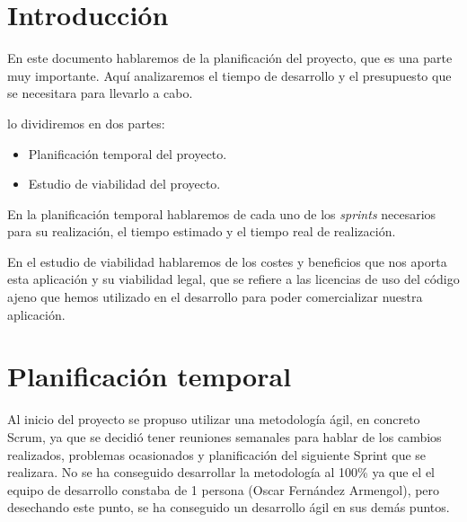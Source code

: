 
\section{Introducción}

En este documento hablaremos de la planificación del proyecto, que es una parte muy importante. Aquí analizaremos el tiempo de desarrollo y el presupuesto que se necesitara para llevarlo a cabo.

lo dividiremos en dos partes:

\begin{itemize}
	\tightlist
	\item
	Planificación temporal del proyecto.
	\item
	Estudio de viabilidad del proyecto.
\end{itemize}

En la planificación temporal hablaremos de cada uno de los \emph{sprints} necesarios para su realización, el tiempo estimado y el tiempo real de realización.

En el estudio de viabilidad hablaremos de los costes y beneficios que nos aporta esta aplicación y su viabilidad legal, que se refiere a las licencias de uso del código ajeno que hemos utilizado en el desarrollo para poder comercializar nuestra aplicación.

\section{Planificación temporal}

Al inicio del proyecto se propuso utilizar una metodología ágil, en concreto Scrum, ya que se decidió tener reuniones semanales para hablar de los cambios realizados, problemas ocasionados y planificación del siguiente Sprint que se realizara. No se ha conseguido desarrollar la metodología al 100\% ya que el el equipo de desarrollo constaba de 1 persona (Oscar Fernández Armengol), pero desechando este punto, se ha conseguido un desarrollo ágil en sus demás puntos. 

